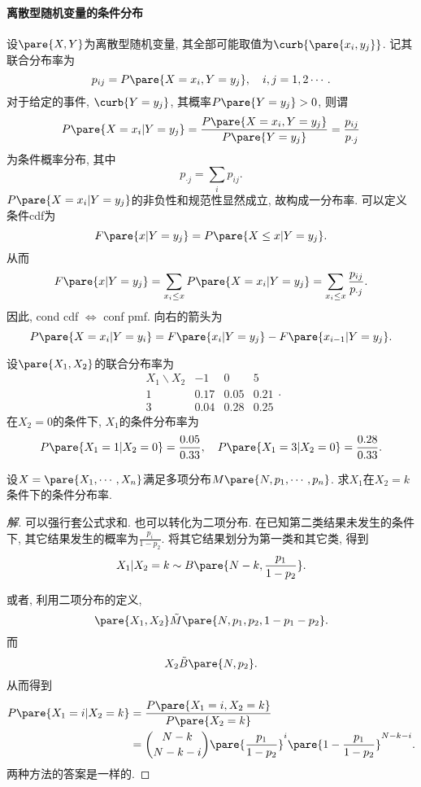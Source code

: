 \documentclass{ctexart}
\begin{document}
\paragraph{离散型随机变量的条件分布} %
\label{par:离散型随机变量的条件分布}

设$\pare{X,Y}$为离散型随机变量, 其全部可能取值为$\curb{\pare{x_i, y_j}}$. 记其联合分布率为
\[ p_{ij} = P\pare{X=x_i,Y=y_j}, \quad i,j = 1,2\cdots. \]
对于给定的事件, $\curb{Y=y_j}$, 其概率$P\pare{Y=y_j}>0$, 则谓
\[ P\pare{X=x_i\vert Y = y_j} = \frac{P\pare{X=x_i,Y=y_j}}{P\pare{Y=y_j}} = \frac{p_{ij}}{p_{\cdot j}} \]
为条件概率分布, 其中
\[ p_{\cdot j} = \sum_i p_{ij}. \]
$P\pare{X=x_i\vert Y = y_j}$的非负性和规范性显然成立, 故构成一分布率. 可以定义条件cdf为
\[ F\pare{x\vert Y = y_j} = P\pare{X\le x\vert Y = y_j}. \]
从而
\[ F\pare{x\vert Y = y_j} = \sum_{x_i\le x} P\pare{X=x_i \vert Y = y_j} = \sum_{x_i \le x} \frac{p_{ij}}{p_{\cdot j}}. \]
因此, cond cdf $\Leftrightarrow$ conf pmf. 向右的箭头为
\[ P\pare{X=x_i\vert Y = y_i} = F\pare{x_i\vert Y=y_j} - F\pare{x_{i-1}\vert Y = y_j}. \]
\begin{sample}
    \begin{ex}
        设$\pare{X_1,X_2}$的联合分布率为
        \[ \begin{array}{cccc}
            X_1\backslash X_2 & -1 & 0 & 5 \\
            1 & 0.17 & 0.05 & 0.21 \\
            3 & 0.04 & 0.28 & 0.25
        \end{array}. \]
        在$X_2=0$的条件下, $X_1$的条件分布率为
        \[ P\pare{X_1 = 1\vert X_2 = 0} = \frac{0.05}{0.33}, \quad P\pare{X_1 = 3\vert X_2 = 0} = \frac{0.28}{0.33}. \]
    \end{ex}
\end{sample}
\begin{sample}
    \begin{ex}
        设$X = \pare{X_1, \cdots, X_n}$满足多项分布$M\pare{N,p_1,\cdots,p_n}$. 求$X_1$在$X_2 = k$条件下的条件分布率.
    \end{ex}
    \begin{proof}[解]
        可以强行套公式求和. 也可以转化为二项分布. 在已知第二类结果未发生的条件下, 其它结果发生的概率为$\displaystyle \frac{p_i}{1-p_2}$. 将其它结果划分为第一类和其它类, 得到
        \[ X_1 \vert X_2 = k \sim B\pare{N-k, \frac{p_1}{1-p_2}}. \]
        \par
        或者, 利用二项分布的定义,
        \[ \pare{X_1,X_2} \tilde M\pare{N, p_1, p_2, 1-p_1-p_2}. \]
        而
        \[ X_2 \tilde B\pare{N, p_2}. \]
        从而得到
        \begin{align*}
            P\pare{X_1 = i\vert X_2 = k} &= \frac{P\pare{X_1 = i,X_2 = k}}{P\pare{X_2 = k}} \\ &= \binom{N-k}{N-k-i}\pare{\frac{p_1}{1-p_2}}^i\pare{1-\frac{p_1}{1-p_2}}^{N-k-i}. 
        \end{align*}
        两种方法的答案是一样的.
    \end{proof}
\end{sample}
\end{document}
